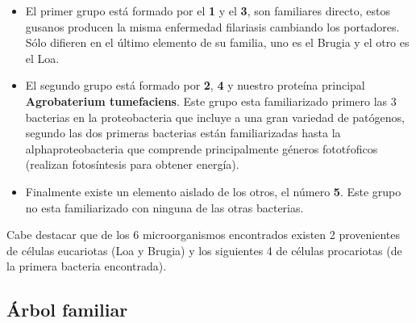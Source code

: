 \begin{itemize}
	\item El primer grupo está formado por el \textbf{1} y el \textbf{3}, son familiares directo,
		estos gusanos producen la misma enfermedad filariasis cambiando los portadores.
		Sólo difieren en el último elemento de su familia, uno es el Brugia y el otro es el Loa.

	\item El segundo grupo está formado por \textbf{2}, \textbf{4} y nuestro proteína principal 
		\textbf{Agrobaterium tumefaciens}.
		Este grupo esta familiarizado primero las 3 bacterias en la proteobacteria que incluye
		a una gran variedad de patógenos, segundo las dos primeras bacterias están familiarizadas
		hasta la alphaproteobacteria que comprende principalmente géneros fototŕoficos (realizan
		fotosíntesis para obtener energía).

	\item Finalmente existe un elemento aislado de los otros, el número \textbf{5}.
		Este grupo no esta familiarizado con ninguna de las otras bacterias.
\end{itemize}

Cabe destacar que de los 6 microorganismos encontrados existen 2 provenientes de células
eucariotas (Loa y Brugia) y los siguientes 4 de células procariotas (de la primera bacteria encontrada).

\subsection{Árbol familiar}

